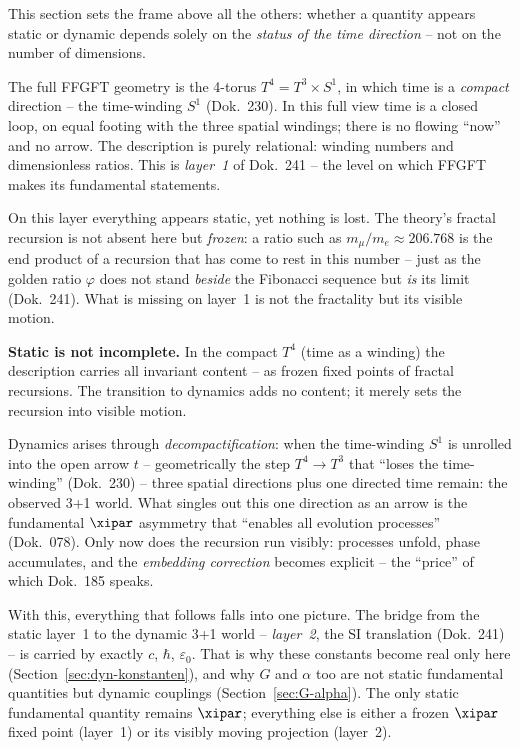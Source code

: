 This section sets the frame above all the others: whether a quantity appears
static or dynamic depends solely on the \emph{status of the time direction} -- not
on the number of dimensions.

The full FFGFT geometry is the 4-torus $T^4 = T^3 \times S^1$, in which time is a
\emph{compact} direction -- the time-winding $S^1$ (Dok.~230). In this full view
time is a closed loop, on equal footing with the three spatial windings; there is
no flowing ``now'' and no arrow. The description is purely relational: winding
numbers and dimensionless ratios. This is \emph{layer~1} of Dok.~241 -- the level
on which FFGFT makes its fundamental statements.

On this layer everything appears static, yet nothing is lost. The theory's fractal
recursion is not absent here but \emph{frozen}: a ratio such as
$m_\mu/m_e \approx 206.768$ is the end product of a recursion that has come to rest
in this number -- just as the golden ratio $\varphi$ does not stand \emph{beside}
the Fibonacci sequence but \emph{is} its limit (Dok.~241). What is missing on
layer~1 is not the fractality but its visible motion.

\begin{prinzip}
\textbf{Static is not incomplete.} In the compact $T^4$ (time as a winding) the
description carries all invariant content -- as frozen fixed points of fractal
recursions. The transition to dynamics adds no content; it merely sets the
recursion into visible motion.
\end{prinzip}

Dynamics arises through \emph{decompactification}: when the time-winding $S^1$ is
unrolled into the open arrow $t$ -- geometrically the step $T^4 \to T^3$ that
``loses the time-winding'' (Dok.~230) -- three spatial directions plus one
directed time remain: the observed 3+1 world. What singles out this one direction
as an arrow is the fundamental $\xipar$ asymmetry that ``enables all evolution
processes'' (Dok.~078). Only now does the recursion run visibly: processes unfold,
phase accumulates, and the \emph{embedding correction} becomes explicit -- the
``price'' of which Dok.~185 speaks.

With this, everything that follows falls into one picture. The bridge from the
static layer~1 to the dynamic 3+1 world -- \emph{layer~2}, the SI translation
(Dok.~241) -- is carried by exactly $c$, $\hbar$, $\varepsilon_0$. That is why
these constants become real only here (Section~\ref{sec:dyn-konstanten}), and why
$G$ and $\alpha$ too are not static fundamental quantities but dynamic couplings
(Section~\ref{sec:G-alpha}). The only static fundamental quantity remains
$\xipar$; everything else is either a frozen $\xipar$ fixed point (layer~1) or its
visibly moving projection (layer~2).

